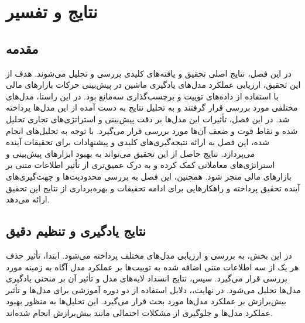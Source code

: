 \chapter{نتایج و تفسیر}
\label{chp:results}
\section{مقدمه}
در این فصل، نتایج اصلی تحقیق و یافته‌های کلیدی بررسی و تحلیل می‌شوند. هدف از این تحقیق، ارزیابی عملکرد مدل‌های یادگیری ماشین در پیش‌بینی حرکات بازارهای مالی با استفاده از داده‌های توییت و برچسب‌گذاری سه‌مانع بود. در این راستا، مدل‌های مختلفی مورد بررسی قرار گرفتند و به تحلیل نتایج به دست آمده از این مدل‌ها پرداخته شد. در این فصل، تأثیرات این مدل‌ها بر دقت پیش‌بینی و استراتژی‌های تجاری تحلیل شده و نقاط قوت و ضعف آن‌ها مورد بررسی قرار می‌گیرد. با توجه به تحلیل‌های انجام شده، این فصل به ارائه نتیجه‌گیری‌های کلیدی و پیشنهادات برای تحقیقات آینده می‌پردازد. نتایج حاصل از این تحقیق می‌تواند به بهبود ابزارهای پیش‌بینی و استراتژی‌های معاملاتی کمک کرده و به درک عمیق‌تری از تأثیر اطلاعات متنی بر بازارهای مالی منجر شود. همچنین، این فصل به بررسی محدودیت‌ها و جهت‌گیری‌های آینده تحقیق پرداخته و راهکارهایی برای ادامه تحقیقات و بهره‌برداری از نتایج این تحقیق ارائه می‌دهد.

\section{نتایج یادگیری و تنظیم دقیق}
در این بخش، به بررسی و ارزیابی مدل‌های مختلف پرداخته می‌شود. ابتدا، تأثیر حذف هر یک از سه اطلاعات متنی اضافه شده به توییت‌ها بر عملکرد مدل آگاه به زمینه مورد بررسی قرار می‌گیرد. سپس، نتایج انسداد لایه‌های مدل و تأثیر آن بر منحنی یادگیری مدل‌ها تحلیل می‌شود. در نهایت،، دلایل استفاده از دو دوره آموزشی برای مدل‌ها و تأثیر بیش‌برازش بر عملکرد مدل‌ها مورد بحث قرار می‌گیرد. این تحلیل‌ها به منظور بهبود عملکرد مدل‌ها و جلوگیری از مشکلات احتمالی مانند بیش‌برازش انجام شده‌اند.

